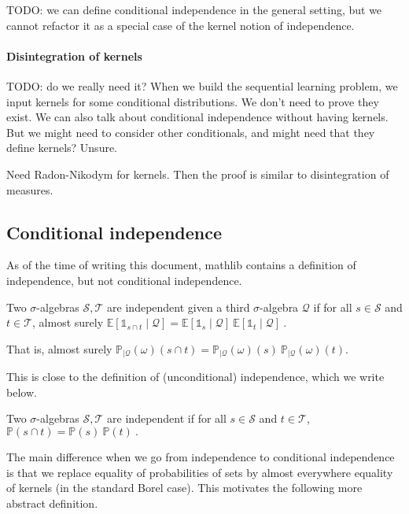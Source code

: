 TODO: we can define conditional independence in the general setting, but we cannot refactor it as a special case of the kernel notion of independence.

\paragraph{Disintegration of kernels}

TODO: do we really need it? When we build the sequential learning problem, we input kernels for some conditional distributions. We don't need to prove they exist. We can also talk about conditional independence without having kernels. But we might need to consider other conditionals, and might need that they define kernels? Unsure.

Need Radon-Nikodym for kernels. Then the proof is similar to disintegration of measures.

\subsection{Conditional independence}
\label{sub:conditional_independence}


As of the time of writing this document, mathlib contains a definition of independence, but not conditional independence.

\begin{definition}
Two $\sigma$-algebras $\mathcal S, \mathcal T$ are independent given a third $\sigma$-algebra $\mathcal Q$ if for all $s \in \mathcal S$ and $t \in \mathcal T$, almost surely
$
\mathbb{E}[\mathbb{1}_{s \cap t} \mid \mathcal Q] = \mathbb{E}[\mathbb{1}_{s} \mid \mathcal Q] \: \mathbb{E}[\mathbb{1}_{t} \mid \mathcal Q]
\: .
$

That is, almost surely $\mathbb{P}_{| \mathcal Q}(\omega)(s \cap t) = \mathbb{P}_{| \mathcal Q}(\omega)(s) \: \mathbb{P}_{| \mathcal Q}(\omega)(t)$.
\end{definition}

This is close to the definition of (unconditional) independence, which we write below.
\begin{definition}
Two $\sigma$-algebras $\mathcal S, \mathcal T$ are independent if for all $s \in \mathcal S$ and $t \in \mathcal T$,
$
\mathbb{P}(s \cap t) = \mathbb{P}(s) \: \mathbb{P}(t)
\: .
$
\end{definition}

The main difference when we go from independence to conditional independence is that we replace equality of probabilities of sets by almost everywhere equality of kernels (in the standard Borel case). This motivates the following more abstract definition.

